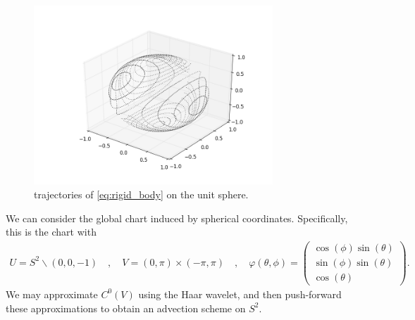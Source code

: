 \documentclass[a4paper, 12 pt]{amsart}
\begin{document}
\begin{figure}[h]
  \centering
  \includegraphics[width=0.8\textwidth]{./images/rigid_body_traj.png}
  \caption{trajectories of \eqref{eq:rigid_body} on the unit sphere.}
  \label{fig:rigid_body_traj}
\end{figure}
We can consider the global chart induced by spherical coordinates.
Specifically, this is the chart with
\begin{align*}
  U = S^2 \backslash (0,0,-1) \quad,\quad
  V = (0,\pi) \times (-\pi,\pi) \quad,\quad
  \varphi(\theta,\phi) = \begin{pmatrix}
    \cos(\phi) \sin(\theta) \\
    \sin(\phi) \sin(\theta) \\
    \cos(\theta)
    \end{pmatrix}.
\end{align*}
We may approximate $C^0(V)$ using the Haar wavelet,
and then push-forward these approximations
to obtain an advection scheme on $S^2$.
\end{document}
